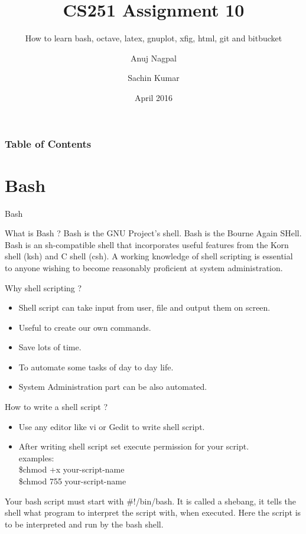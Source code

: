 \documentclass[pdf]{beamer}
\title{CS251 Assignment 10}
\subtitle{How to learn bash, octave, latex, gnuplot, xfig, html, git and bitbucket}
\author{Anuj Nagpal \and Sachin Kumar}
\institute{IIT Kanpur}
\date{April 2016}
\begin{document}
\begin{frame}
	\titlepage
\end{frame}

\begin{frame}
\frametitle{Table of Contents}
\tableofcontents
\end{frame}

\section{Bash}

\begin{frame}{Bash}
	\begin{block}{What is Bash ?}
	Bash is the GNU Project’s shell. Bash is the Bourne Again SHell. Bash is an sh-compatible shell that incorporates useful features from the Korn shell (ksh) and C shell (csh). A working knowledge of shell scripting is essential to anyone wishing to become reasonably proficient at system administration.
	\end{block}
\end{frame}

\begin{frame}
	\begin{block}{Why shell scripting ?}
	\begin{itemize}
	\item Shell script can take input from user, file and output them on screen.
	\item Useful to create our own commands.
	\item Save lots of time.
	\item To automate some tasks of day to day life.
	\item System Administration part can be also automated.
	\end{itemize}
	\end{block}
\end{frame}

\begin{frame}
\begin{block}{How to write a shell script ?}
\begin{itemize}
\item Use any editor like vi or Gedit to write shell script.
\item After writing shell script set execute permission for your script. \\
	examples:\\
	\$chmod +x your-script-name	\\
	\$chmod 755 your-script-name
\end{itemize}
\end{block}

\begin{block}{}
	Your bash script must start with \#!/bin/bash. It is called a shebang, it tells the shell what program to interpret the script with, when executed. Here the script is to be interpreted and run by the bash shell.
\end{block}

\end{frame}
\end{document}
